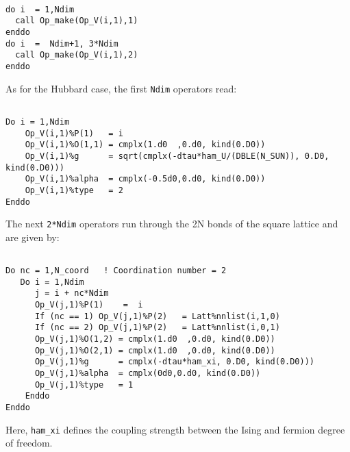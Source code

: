 \begin{lstlisting}

do i  = 1,Ndim
  call Op_make(Op_V(i,1),1)
enddo
do i  =  Ndim+1, 3*Ndim
  call Op_make(Op_V(i,1),2)
enddo

\end{lstlisting}
As for the Hubbard case, the first \texttt{Ndim}  operators read: 

\begin{lstlisting}

Do i = 1,Ndim
    Op_V(i,1)%P(1)   = i
    Op_V(i,1)%O(1,1) = cmplx(1.d0  ,0.d0, kind(0.D0))
    Op_V(i,1)%g      = sqrt(cmplx(-dtau*ham_U/(DBLE(N_SUN)), 0.D0, kind(0.D0)))
    Op_V(i,1)%alpha  = cmplx(-0.5d0,0.d0, kind(0.D0))
    Op_V(i,1)%type   = 2
Enddo

\end{lstlisting}
The  next \texttt{2*Ndim} operators run through the 2N bonds of the square lattice and   are given by:
\begin{lstlisting}

Do nc = 1,N_coord   ! Coordination number = 2
   Do i = 1,Ndim
      j = i + nc*Ndim
      Op_V(j,1)%P(1)    =  i 
      If (nc == 1) Op_V(j,1)%P(2)   = Latt%nnlist(i,1,0)
      If (nc == 2) Op_V(j,1)%P(2)   = Latt%nnlist(i,0,1)
      Op_V(j,1)%O(1,2) = cmplx(1.d0  ,0.d0, kind(0.D0))
      Op_V(j,1)%O(2,1) = cmplx(1.d0  ,0.d0, kind(0.D0))
      Op_V(j,1)%g      = cmplx(-dtau*ham_xi, 0.D0, kind(0.D0)))
      Op_V(j,1)%alpha  = cmplx(0d0,0.d0, kind(0.D0))
      Op_V(j,1)%type   = 1
    Enddo
Enddo

\end{lstlisting}
Here,  \texttt{ham\_xi} defines the coupling strength  between the Ising  and fermion degree of freedom.

